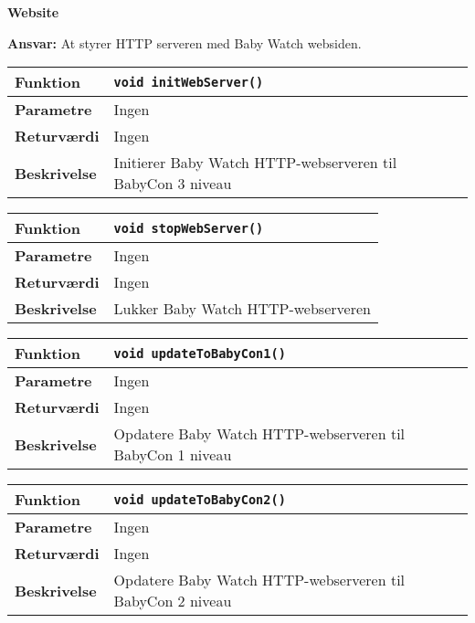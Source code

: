 {\centering
\textbf{Website}\par
}
\textbf{Ansvar:} At styrer HTTP serveren med Baby Watch websiden. \

\begin{center}
    \begin{tabular}{ | l | p{} |}
    \hline
    \textbf{Funktion}	& \verb+void initWebServer() +						\\ \hline
    \textbf{Parametre} 	& Ingen		\\ \hline
    \textbf{Returværdi}	& Ingen 								\\ \hline
    \textbf{Beskrivelse}	& Initierer Baby Watch HTTP-webserveren til BabyCon 3 niveau\\ \hline
    \end{tabular}
\end{center}

\begin{center}
    \begin{tabular}{ | l | p{} |}
    \hline
    \textbf{Funktion}	& \verb+void stopWebServer() +						\\ \hline
    \textbf{Parametre} 	& Ingen		\\ \hline
    \textbf{Returværdi}	& Ingen 								\\ \hline
    \textbf{Beskrivelse}	& Lukker Baby Watch HTTP-webserveren \\ \hline
    \end{tabular}
\end{center}

\begin{center}
    \begin{tabular}{ | l | p{} |}
    \hline
    \textbf{Funktion}	& \verb+void updateToBabyCon1() +						\\ \hline
    \textbf{Parametre} 	& Ingen													\\ \hline
    \textbf{Returværdi}	& Ingen 												\\ \hline
    \textbf{Beskrivelse}	& Opdatere Baby Watch HTTP-webserveren til BabyCon 1 niveau\\ \hline
    \end{tabular}
\end{center}

\begin{center}
    \begin{tabular}{ | l | p{} |}
    \hline
    \textbf{Funktion}	& \verb+void updateToBabyCon2() +						\\ \hline
    \textbf{Parametre} 	& Ingen													\\ \hline
    \textbf{Returværdi}	& Ingen 												\\ \hline
    \textbf{Beskrivelse}	& Opdatere Baby Watch HTTP-webserveren til BabyCon 2 niveau\\ \hline
    \end{tabular}
\end{center}

